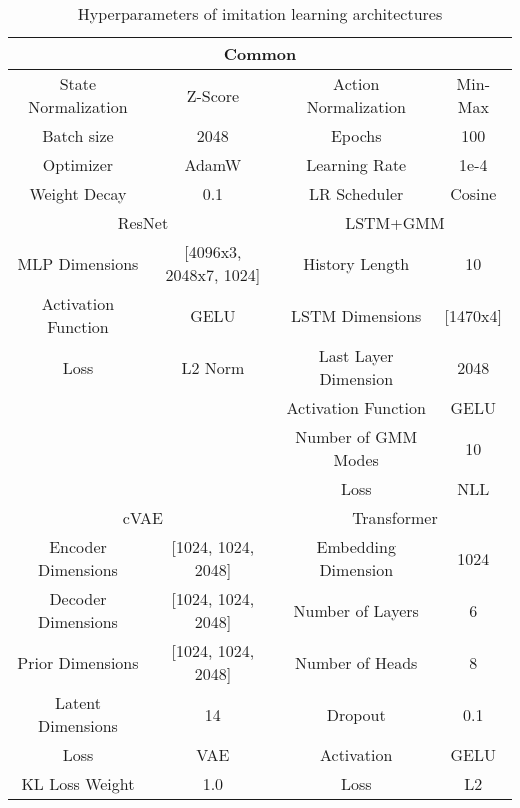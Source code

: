 \begin{table}[h!]
    \centering
    \setlength\tabcolsep{9 pt}
    \begin{tabular}{c|c|c|c}
    \toprule
    \multicolumn{4}{c}{Common} \\
    \midrule
    State Normalization & Z-Score & Action Normalization & Min-Max \\
    
    Batch size & 2048 & Epochs & 100 \\
    
    Optimizer & AdamW & Learning Rate & 1e-4 \\
    
    Weight Decay & 0.1 & LR Scheduler & Cosine \\
    
    \midrule
    \multicolumn{2}{c|}{ResNet} & \multicolumn{2}{c}{LSTM+GMM} \\
    
    \midrule
    MLP Dimensions & [4096x3, 2048x7, 1024]  & 
    History Length & 10 \\
    
    Activation Function & GELU & 
    LSTM Dimensions & [1470x4] \\
    
    Loss & L2 Norm & 
    Last Layer Dimension & 2048 \\
    
    & & 
    Activation Function & GELU \\
    
    & & 
    Number of GMM Modes & 10 \\
    
    & & 
    Loss & NLL \\
    \midrule
    \multicolumn{2}{c|}{cVAE} & \multicolumn{2}{c}{Transformer} \\
    \midrule
    Encoder Dimensions & [1024, 1024, 2048] & 
    Embedding Dimension & 1024 \\
    Decoder Dimensions & [1024, 1024, 2048] & 
    Number of Layers & 6 \\
    Prior Dimensions & [1024, 1024, 2048] & 
    Number of Heads & 8 \\
    Latent Dimensions & 14 & 
    Dropout & 0.1 \\
    Loss & VAE & 
    Activation & GELU \\
    KL Loss Weight & 1.0 & 
    Loss & L2 \\
    \bottomrule
    \end{tabular}
    \caption{Hyperparameters of imitation learning architectures}
    \label{table:IL_ablation_hyper}
\end{table}
